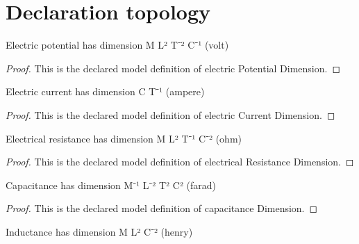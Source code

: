\section{Declaration topology}
\begin{definition}
  \label{def:physics:phyx-mini-0991:phyxminiproblems-problemphyxmini0991-electricpotentialdimension}
  Electric potential has dimension M L² T⁻² C⁻¹ (volt)
\end{definition}
\begin{proof}
  This is the declared model definition of electric Potential Dimension.
\end{proof}
\begin{definition}
  \label{def:physics:phyx-mini-0991:phyxminiproblems-problemphyxmini0991-electriccurrentdimension}
  Electric current has dimension C T⁻¹ (ampere)
\end{definition}
\begin{proof}
  This is the declared model definition of electric Current Dimension.
\end{proof}
\begin{definition}
  \label{def:physics:phyx-mini-0991:phyxminiproblems-problemphyxmini0991-electricalresistancedimension}
  Electrical resistance has dimension M L² T⁻¹ C⁻² (ohm)
\end{definition}
\begin{proof}
  This is the declared model definition of electrical Resistance Dimension.
\end{proof}
\begin{definition}
  \label{def:physics:phyx-mini-0991:phyxminiproblems-problemphyxmini0991-capacitancedimension}
  Capacitance has dimension M⁻¹ L⁻² T² C² (farad)
\end{definition}
\begin{proof}
  This is the declared model definition of capacitance Dimension.
\end{proof}
\begin{definition}
  \label{def:physics:phyx-mini-0991:phyxminiproblems-problemphyxmini0991-inductancedimension}
  Inductance has dimension M L² C⁻² (henry)
\end{definition}
